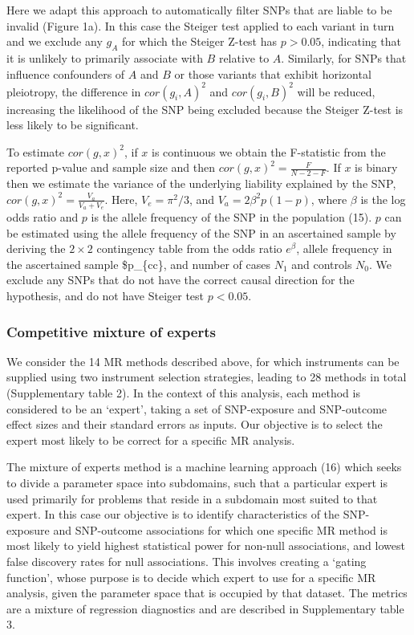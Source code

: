 \documentclass[]{article}
\begin{document}
Here we adapt this approach to automatically filter SNPs that are liable
to be invalid (Figure 1a). In this case the Steiger test applied to each
variant in turn and we exclude any \(g_{A}\) for which the Steiger
Z-test has \(p > 0.05\), indicating that it is unlikely to primarily
associate with \(B\) relative to \(A\). Similarly, for SNPs that
influence confounders of \(A\) and \(B\) or those variants that exhibit
horizontal pleiotropy, the difference in \(cor(g_{i}, A)^2\) and
\(cor(g_{i}, B)^2\) will be reduced, increasing the likelihood of the
SNP being excluded because the Steiger Z-test is less likely to be
significant.

To estimate \(cor(g, x)^2\), if \(x\) is continuous we obtain the
F-statistic from the reported p-value and sample size and then
\(cor(g, x)^2 = \frac{F}{N - 2 - F}\). If \(x\) is binary then we
estimate the variance of the underlying liability explained by the SNP,
\(cor(g, x)^2 = \frac{V_a}{V_a + V_e}\). Here, \(V_e = \pi^2/3\), and
\(V_a = 2\beta^2p(1-p)\), where \(\beta\) is the log odds ratio and
\(p\) is the allele frequency of the SNP in the population (15). \(p\)
can be estimated using the allele frequency of the SNP in an ascertained
sample by deriving the \(2 \times 2\) contingency table from the odds
ratio \(e^\beta\), allele frequency in the ascertained sample
\$p\_\{cc\}, and number of cases \(N_1\) and controls \(N_0\). We
exclude any SNPs that do not have the correct causal direction for the
hypothesis, and do not have Steiger test \(p < 0.05\).

\subsubsection{Competitive mixture of
experts}\label{competitive-mixture-of-experts}

We consider the 14 MR methods described above, for which instruments can
be supplied using two instrument selection strategies, leading to 28
methods in total (Supplementary table 2). In the context of this
analysis, each method is considered to be an `expert', taking a set of
SNP-exposure and SNP-outcome effect sizes and their standard errors as
inputs. Our objective is to select the expert most likely to be correct
for a specific MR analysis.

The mixture of experts method is a machine learning approach (16) which
seeks to divide a parameter space into subdomains, such that a
particular expert is used primarily for problems that reside in a
subdomain most suited to that expert. In this case our objective is to
identify characteristics of the SNP-exposure and SNP-outcome
associations for which one specific MR method is most likely to yield
highest statistical power for non-null associations, and lowest false
discovery rates for null associations. This involves creating a `gating
function', whose purpose is to decide which expert to use for a specific
MR analysis, given the parameter space that is occupied by that dataset.
The metrics are a mixture of regression diagnostics and are described in
Supplementary table 3.
\end{document}
